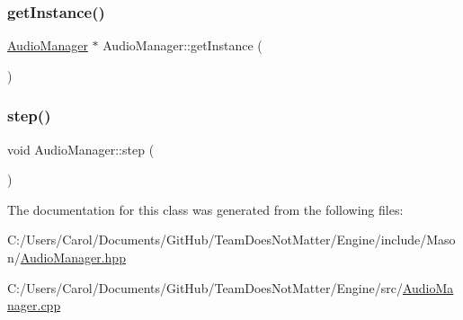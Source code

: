 \hypertarget{class_mason_1_1_audio_manager_a77de22887544ce37ae13d7c4d5cf7a79}{}\label{class_mason_1_1_audio_manager_a77de22887544ce37ae13d7c4d5cf7a79} 
\subsubsection{\texorpdfstring{get\+Instance()}{getInstance()}}
{\footnotesize\ttfamily \hyperlink{class_mason_1_1_audio_manager}{Audio\+Manager} $\ast$ Audio\+Manager\+::get\+Instance (\begin{DoxyParamCaption}{ }\end{DoxyParamCaption})\hspace{0.3cm}{\ttfamily [static]}}

\hypertarget{class_mason_1_1_audio_manager_a81eb2ff2bc2d1242e532c208b32d17ec}{}\label{class_mason_1_1_audio_manager_a81eb2ff2bc2d1242e532c208b32d17ec} 
\subsubsection{\texorpdfstring{step()}{step()}}
{\footnotesize\ttfamily void Audio\+Manager\+::step (\begin{DoxyParamCaption}{ }\end{DoxyParamCaption})}



The documentation for this class was generated from the following files\+:\begin{DoxyCompactItemize}
\item 
C\+:/\+Users/\+Carol/\+Documents/\+Git\+Hub/\+Team\+Does\+Not\+Matter/\+Engine/include/\+Mason/\hyperlink{_audio_manager_8hpp}{Audio\+Manager.\+hpp}\item 
C\+:/\+Users/\+Carol/\+Documents/\+Git\+Hub/\+Team\+Does\+Not\+Matter/\+Engine/src/\hyperlink{_audio_manager_8cpp}{Audio\+Manager.\+cpp}\end{DoxyCompactItemize}
